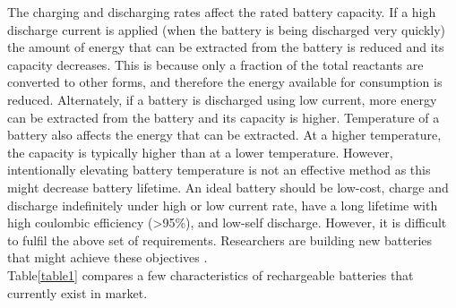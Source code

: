 The charging and discharging rates affect the rated battery capacity. If a high discharge current is applied (when the battery is being discharged very quickly) the amount of energy that can be extracted from the battery is reduced and its capacity decreases. This is because only a fraction of the total reactants are converted to other forms, and therefore the energy available for consumption is reduced. Alternately, if a battery is discharged using low current, more energy can be extracted from the battery and its capacity is higher. Temperature of a battery also affects the energy that can be extracted. At a higher temperature, the capacity is typically higher than at a lower temperature. However, intentionally elevating battery temperature is not an effective method as this might decrease battery lifetime\cite{leng_lifetime, ma_temperature}. 
An ideal battery should be low-cost, charge and discharge indefinitely under high or low current rate, have a long lifetime with high coulombic efficiency (>95\%), and low-self discharge. However, it is difficult to fulfil the above set of requirements. Researchers are building new batteries that might achieve these objectives \cite{slater_sodium-ion_2013,jian_carbon_2015,aurbach_prototype_2000,lin_ultrafast_2015-2}. \\

Table\ref{table1} compares a few characteristics of rechargeable batteries that currently exist in market. 

